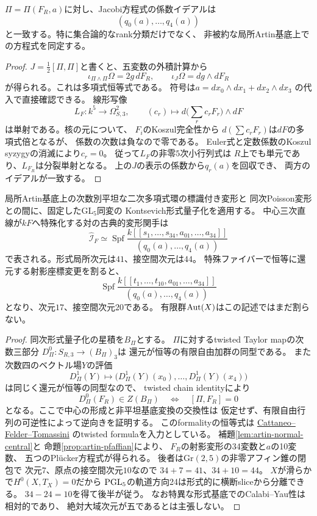 \begin{proposition}
\label{prop:artin-pfaffian}
$\Pi=\Pi(F_R,a)$に対し、Jacobi方程式の係数イデアルは
\[
 (q_0(a),\ldots,q_4(a))
\]
と一致する。特に集合論的なrank分類だけでなく、
非被約な局所Artin基底上での方程式を同定する。
\end{proposition}
\begin{proof}
$J=\frac12[\Pi,\Pi]$と書くと、五変数の外積計算から
\[
 \iota_{\Pi\wedge\Pi}\Omega=2g\,dF_R,\qquad
 \iota_J\Omega=dg\wedge dF_R
\]
が得られる。これは多項式恒等式である。
符号は$ a=dx_0\wedge dx_1+dx_2\wedge dx_3$
の代入で直接確認できる。
線形写像
\[
 L_F:k^5\longrightarrow\Omega^2_{S,3},\qquad
 (c_r)\longmapsto d\bigl(\textstyle\sum_rc_rF_r\bigr)\wedge dF
\]
は単射である。核の元について、
$F_i$のKoszul完全性から
$d(\sum c_rF_r)$は$dF$の多項式倍となるが、
係数の次数は負なので零である。
Euler式と定数係数のKoszul syzygyの消滅により$c_r=0$。
従って$L_F$の非零$5$次小行列式は
$R$上でも単元であり、$L_{F_R}$は分裂単射となる。
上の$J$の表示の係数から$q_r(a)$を回収でき、
両方のイデアルが一致する。
\end{proof}

\begin{theorem}
\label{thm:artin-central-pair}
局所Artin基底上の次数別平坦な二次多項式環の標識付き変形と
同次Poisson変形との間に、固定したGL$_5$同変の
Kontsevich形式量子化を適用する。
中心三次直線が$kF$へ特殊化する対の古典的変形関手は
\[
 \widehat{\mathcal I}_{F}\simeq
 \operatorname{Spf}\frac{
  k[[s_1,\ldots,s_{34},a_{01},\ldots,a_{34}]]
 }{(q_0(a),\ldots,q_4(a))}
\]
で表される。形式局所次元は$41$、接空間次元は$44$。
特殊ファイバーで恒等に還元する射影座標変更を割ると、
\[
 \operatorname{Spf}\frac{
 k[[t_1,\ldots,t_{10},a_{01},\ldots,a_{34}]]
 }{(q_0(a),\ldots,q_4(a))}
\]
となり、次元$17$、接空間次元$20$である。
有限群$\operatorname{Aut}(X)$はこの記述ではまだ割らない。
\end{theorem}
\begin{proof}
同次形式量子化の星積を$B_\Pi$とする。
$\Pi$に対するtwisted Taylor mapの次数三部分
$D^0_\Pi:S_{R,3}\to(B_\Pi)_3$は
還元が恒等の有限自由加群の同型である。
また次数四のベクトル場$Y$の評価
\[
 D^1_\Pi(Y)\longmapsto
 \bigl(D^1_\Pi(Y)(x_0),\ldots,D^1_\Pi(Y)(x_4)\bigr)
\]
は同じく還元が恒等の同型なので、
twisted chain identityにより
\[
 D^0_\Pi(F_R)\in Z(B_\Pi)
 \quad\Longleftrightarrow\quad [\Pi,F_R]=0
\]
となる。ここで中心の形成と非平坦基底変換の交換性は
仮定せず、有限自由行列の可逆性によって逆向きを証明する。
このformalityの恒等式は
\href{https://arxiv.org/abs/math/0012228}{Cattaneo--Felder--Tomassini}
のtwisted formulaを入力としている。
補題\ref{lem:artin-normal-central}と
命題\ref{prop:artin-pfaffian}により、
$F_R$の射影変形の34変数と$a$の10変数、
五つのPl\"ucker方程式が得られる。
後者は$\mathrm{Gr}(2,5)$の非零アフィン錐の閉包で
次元$7$、原点の接空間次元$10$なので
$34+7=41$、$34+10=44$。
$X$が滑らかで$H^0(X,T_X)=0$だから
$\mathrm{PGL}_5$の軌道方向24は形式的に横断sliceから分離できる。
$34-24=10$を得て後半が従う。
なお特異な形式基底でのCalabi--Yau性は相対的であり、
絶対大域次元が五であるとは主張しない。
\end{proof}


